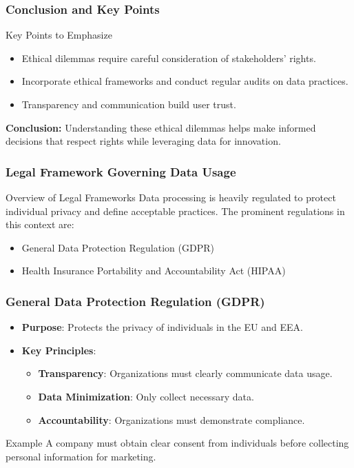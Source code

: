 \documentclass{beamer}
\begin{document}
\begin{frame}[fragile]
    \frametitle{Conclusion and Key Points}
    \begin{block}{Key Points to Emphasize}
        \begin{itemize}
            \item Ethical dilemmas require careful consideration of stakeholders' rights.
            \item Incorporate ethical frameworks and conduct regular audits on data practices.
            \item Transparency and communication build user trust.
        \end{itemize}
    \end{block}
    
    \textbf{Conclusion:} Understanding these ethical dilemmas helps make informed decisions that respect rights while leveraging data for innovation.
\end{frame}

\begin{frame}[fragile]
    \frametitle{Legal Framework Governing Data Usage}
    \begin{block}{Overview of Legal Frameworks}
        Data processing is heavily regulated to protect individual privacy and define acceptable practices. 
        The prominent regulations in this context are:
    \end{block}
    \begin{itemize}
        \item General Data Protection Regulation (GDPR)
        \item Health Insurance Portability and Accountability Act (HIPAA)
    \end{itemize}
\end{frame}

\begin{frame}[fragile]
    \frametitle{General Data Protection Regulation (GDPR)}
    \begin{itemize}
        \item \textbf{Purpose}: Protects the privacy of individuals in the EU and EEA.
        \item \textbf{Key Principles}:
        \begin{itemize}
            \item \textbf{Transparency}: Organizations must clearly communicate data usage.
            \item \textbf{Data Minimization}: Only collect necessary data.
            \item \textbf{Accountability}: Organizations must demonstrate compliance.
        \end{itemize}
    \end{itemize}
    \begin{block}{Example}
        A company must obtain clear consent from individuals before collecting personal information for marketing.
    \end{block}
\end{frame}
\end{document}
